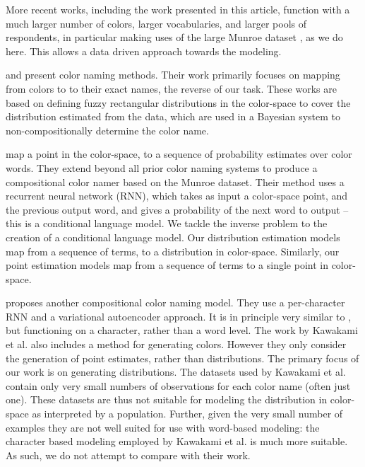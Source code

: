 \documentclass[]{clv3}
\newcommand{\parencite}{\citep}
\newcommand{\textcite}{\citet}
\begin{document}
More recent works, including the work presented in this article, function with a much larger number of colors, larger vocabularies, and larger pools of respondents, 
in particular making uses of the large Munroe dataset \parencite{Munroe2010XKCDdataset}, as we do here.
This allows a data driven approach towards the modeling.


\textcite{mcmahan2015bayesian} and \textcite{meomcmahanstone:color} present color naming methods.
Their work primarily focuses on mapping from colors to to their exact names, the reverse of our task.
These works are based on defining fuzzy rectangular distributions in the color-space to cover the distribution estimated from the data, which are used in a Bayesian system to non-compositionally determine the color name.


\textcite{2016arXiv160603821M} map a point in the color-space, to a sequence of probability estimates over color words.
They extend beyond all prior color naming systems to produce a compositional color namer based on the Munroe dataset.
Their method uses a recurrent neural network (RNN), which takes as input a color-space point, and the previous output word, and gives a probability of the next word to output -- this is a conditional language model.
We tackle the inverse problem to the creation of a conditional language model.
Our distribution estimation models map from a sequence of terms, to a distribution in color-space.
Similarly, our point estimation models map from a sequence of terms to a single point in color-space.


\textcite{DBLP:journals/corr/KawakamiDRS16} proposes another compositional color naming model.
They use a per-character RNN and a variational autoencoder approach.
It is in principle very similar to \textcite{2016arXiv160603821M}, but functioning on a character, rather than a word level.
The work by Kawakami et al. also includes a method for generating colors.
However they only consider the generation of point estimates, rather than distributions.
The primary focus of our work is on generating distributions.
The datasets used by Kawakami et al. contain only very small numbers of observations for each color name (often just one).
These datasets are thus not suitable for modeling the distribution in color-space as interpreted by a population.
Further, given the very small number of examples they are not well suited for use with word-based modeling: the character based modeling employed by Kawakami et al. is much more suitable.
As such, we do not attempt to compare with their work.
\end{document}
